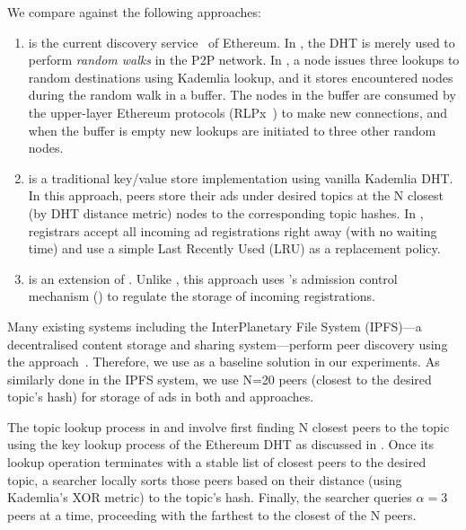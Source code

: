 We compare \sysname against the following approaches:
\begin{enumerate}
\item \discv is the current discovery service~\cite{discv4} of Ethereum. In \discv, the DHT is merely used to perform \emph{random walks} in the P2P network. 
In \discv, a node issues three lookups to random destinations using  Kademlia lookup,  and it stores encountered nodes during the random walk in a buffer. The nodes in the buffer are consumed by the upper-layer Ethereum protocols (\eg RLPx~\cite{rlpx}) to make new connections, and when the buffer is empty new lookups are initiated to three other random nodes.
\item \altname is a traditional key/value store implementation using vanilla Kademlia DHT. 
In this approach, peers store their ads under desired topics at the N closest  (by DHT distance metric) nodes to the corresponding topic hashes. In \altname, registrars accept all incoming ad registrations right away (\ie with no waiting time) and use a simple Last Recently Used (LRU) as a replacement policy.
\item \altnameticket is an extension of \altname. Unlike \altname, this approach uses \sysname's admission control mechanism () to regulate the storage of incoming registrations. 
\end{enumerate}


Many existing systems including the InterPlanetary File System (IPFS)---a decentralised content storage and sharing system---perform peer discovery using the \altname approach~\cite{libp2p_kaddht}. Therefore, we use \altname as a baseline solution in our experiments. 
As similarly done in the IPFS system, we use N=20 peers (\ie closest to the desired topic's hash) for storage of ads in both \altname and \altnameticket approaches.

The topic lookup process in \altname and \altnameticket involve first finding N closest peers to the topic using the key lookup process of the Ethereum DHT as discussed in . Once its lookup operation terminates with a stable list of closest peers to the desired topic, a searcher locally sorts those peers based on their distance (using Kademlia's XOR metric) to the topic's hash. Finally, the searcher queries $\alpha=3$ peers at a time, proceeding with the farthest to the closest of the N peers.

